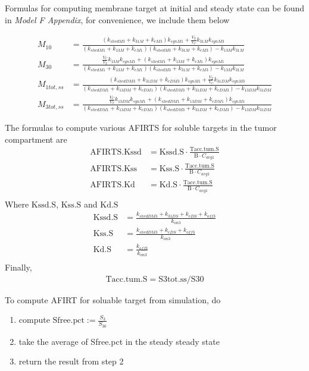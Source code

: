 Formulas for computing membrane target at initial and steady state can be found in 
\emph{Model F Appendix}, for convenience, we include them below

\newcommand{\Det}{(k_{shedM1} + k_{13M} + k_{eM1})(k_{shedM3} + k_{31M} + k_{eM3}) - k_{13M}k_{31M}}

\newcommand{\DetSS}{(k_{shedDM1} + k_{13DM} + k_{eDM1})(k_{shedDM3} + k_{31DM} + k_{eDM3})
- k_{13DM}k_{31DM}}
\begin{align*}
    M_{10} & = \frac{(k_{shedM3} + k_{31M} + k_{eM3})k_{synM1} + \frac{V_T}{V_C}k_{31M}k_{synM3}}
                    {\Det} \\
    M_{30} & = \frac{\frac{V_C}{V_T}k_{13M}k_{synM1} + (k_{shedM1} + k_{13M} + k_{eM1})k_{synM1}}
                    {\Det} \\
    M_{1tot,ss} & = \frac{(k_{shedDM3} + k_{31DM} + k_{eDM3})k_{synM1} + 
                            \frac{V_T}{V_C}k_{31DM}k_{synM3}}
                    {\DetSS} \\
    M_{3tot,ss} & = \frac{\frac{V_C}{V_T}k_{13DM}k_{synM1} + 
                            (k_{shedDM1} + k_{13DM} + k_{eDM1})k_{synM1}}
                    {\DetSS}
\end{align*}


The formulas to compute various AFIRTS for soluble targets in the tumor compartment are 
\begin{align}
    \text{AFIRTS.Kssd} & = \text{Kssd.S}\cdot \frac{\text{Tacc.tum.S}}{\text{B}\cdot C_{avg1}} \\
    \text{AFIRTS.Kss}  & = \text{Kss.S}\cdot \frac{\text{Tacc.tum.S}}{\text{B}\cdot C_{avg1}} \\
    \text{AFIRTS.Kd}   & = \text{Kd.S}\cdot \frac{\text{Tacc.tum.S}}{\text{B}\cdot C_{avg1}} \\
\end{align}
Where $\text{Kssd.S}$, $\text{Kss.S}$ and $\text{Kd.S}$
\begin{align}
    \text{Kssd.S} & = \frac{k_{shedDM3} + k_{31DS} + k_{eDS} + k_{off3}}{k_{on3}} \\
    \text{Kss.S}  & = \frac{k_{shedDM3} + k_{eDS} + k_{off3}}{k_{on3}} \\
    \text{Kd.S}   & = \frac{k_{off3}}{k_{on3}} \\
\end{align}
 Finally,
\begin{align}
    \text{Tacc.tum.S} = \text{S3tot.ss} / \text{S30}
\end{align}


To compute AFIRT for soluable target from simulation, do
\begin{enumerate}
\item compute $\text{Sfree.pct}:=\frac{S_3}{S_{30}}$
\item take the average of Sfree.pct in the steady steady state
\item return the result from step 2
\end{enumerate}